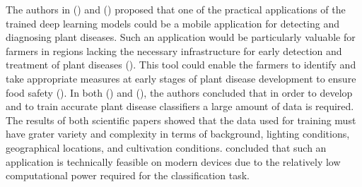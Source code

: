 \documentclass{BachelorBUI}
\begin{document}
The authors in (\cite{Mohanty:2016}) and (\cite{Ferentinos:2018}) proposed that one of the practical applications of the trained deep learning models could be a mobile application for detecting and diagnosing plant diseases. Such an application would be particularly valuable for farmers in regions lacking the necessary infrastructure for early detection and treatment of plant diseases (\cite{Ferentinos:2018}). This tool could enable the farmers to identify and take appropriate measures at early stages of plant disease development to ensure food safety (\cite{Mohanty:2016}). In both (\cite{Mohanty:2016}) and (\cite{Ferentinos:2018}), the authors concluded that in order to develop and to train accurate plant disease classifiers a large amount of data is required. The results of both scientific papers showed that the data used for training must have grater variety and complexity in terms of background, lighting conditions, geographical locations, and cultivation conditions. \textcite{Ferentinos:2018} concluded that such an application is technically feasible on modern devices due to the relatively low computational power required for the classification task.
\end{document}
